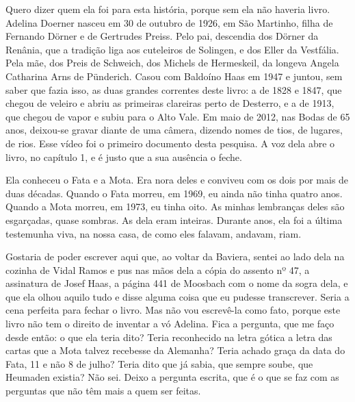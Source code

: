 \documentclass[
  brazilian,
  11pt,
  openany]{book}
\begin{document}
Quero dizer quem ela foi para esta história, porque sem ela não haveria
livro. Adelina Doerner nasceu em 30 de outubro de 1926, em São Martinho,
filha de Fernando Dörner e de Gertrudes Preiss. Pelo pai, descendia dos
Dörner da Renânia, que a tradição liga aos cuteleiros de Solingen, e dos
Eller da Vestfália. Pela mãe, dos Preis de Schweich, dos Michels de
Hermeskeil, da longeva Angela Catharina Arns de Pünderich. Casou com
Baldoíno Haas em 1947 e juntou, sem saber que fazia isso, as duas
grandes correntes deste livro: a de 1828 e 1847, que chegou de veleiro e
abriu as primeiras clareiras perto de Desterro, e a de 1913, que chegou
de vapor e subiu para o Alto Vale. Em maio de 2012, nas Bodas de 65
anos, deixou-se gravar diante de uma câmera, dizendo nomes de tios, de
lugares, de rios. Esse vídeo foi o primeiro documento desta pesquisa. A
voz dela abre o livro, no capítulo 1, e é justo que a sua ausência o
feche.

Ela conheceu o Fata e a Mota. Era nora deles e conviveu com os dois por
mais de duas décadas. Quando o Fata morreu, em 1969, eu ainda não tinha
quatro anos. Quando a Mota morreu, em 1973, eu tinha oito. As minhas
lembranças deles são esgarçadas, quase sombras. As dela eram inteiras.
Durante anos, ela foi a última testemunha viva, na nossa casa, de como
eles falavam, andavam, riam.

Gostaria de poder escrever aqui que, ao voltar da Baviera, sentei ao
lado dela na cozinha de Vidal Ramos e pus nas mãos dela a cópia do
assento nº 47, a assinatura de Josef Haas, a página 441 de Moosbach com
o nome da sogra dela, e que ela olhou aquilo tudo e disse alguma coisa
que eu pudesse transcrever. Seria a cena perfeita para fechar o livro.
Mas não vou escrevê-la como fato, porque este livro não tem o direito de
inventar a vó Adelina. Fica a pergunta, que me faço desde então: o que
ela teria dito? Teria reconhecido na letra gótica a letra das cartas que
a Mota talvez recebesse da Alemanha? Teria achado graça da data do Fata,
11 e não 8 de julho? Teria dito que já sabia, que sempre soube, que
Heumaden existia? Não sei. Deixo a pergunta escrita, que é o que se faz
com as perguntas que não têm mais a quem ser feitas.
\end{document}
